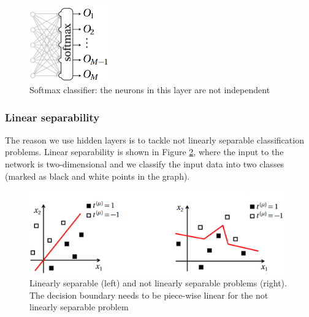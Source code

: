 \vspace{3mm}
\begin{figure}[htb]
	\begin{center}
		\includegraphics*[width=3.4cm, keepaspectratio]{obr/softmax.png}
	\end{center}
	\vspace{3mm}
	\caption{Softmax classifier: the neurons in this layer are
		not independent \cite{mehlig}} 
	\label{softmax}
\end{figure}

\subsubsection{Linear separability}

The reason we use hidden layers is to tackle not linearly separable classification problems. Linear separability is shown in Figure \ref{separability}, where the input to the network is two-dimensional and we classify the input data into two classes (marked as black and white points in the graph). 

\begin{figure}[htb]
	\begin{center}
		\includegraphics*[width=11cm, keepaspectratio]{obr/separability.png}
	\end{center}
	\vspace{3mm}
	\caption{Linearly separable (left) and not linearly separable problems (right). The decision boundary needs to be piece-wise linear for the not linearly separable problem \cite{mehlig}} 
	\label{separability}
\end{figure}


